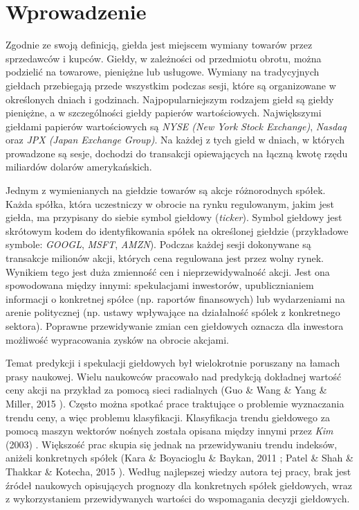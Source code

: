 \documentclass[a4paper, twoside, 11pt, openright]{article}
\newcommand{\fncymain}{%
	\fancyhead[RO]{{\footnotesize \rightmark}}
	\fancyfoot[RO]{\thepage}
	\fancyhead[LE]{{\footnotesize \leftmark}}
	\fancyfoot[LE]{\thepage}
	\fancyfoot[C]{}
	\renewcommand{\headrulewidth}{0.3pt}}
\begin{document}
\fncymain

\cleardoublepage

\tableofcontents

\cleardoublepage

\section{Wprowadzenie}

Zgodnie ze swoją definicją, giełda jest miejscem wymiany towarów przez sprzedawców i kupców. Giełdy, w zależności od przedmiotu obrotu, można podzielić na towarowe, pieniężne lub usługowe. Wymiany na tradycyjnych giełdach przebiegają przede wszystkim podczas sesji, które są organizowane w określonych dniach i godzinach. Najpopularniejszym rodzajem giełd są giełdy pieniężne, a w szczególności giełdy papierów wartościowych. Największymi giełdami papierów wartościowych są \textit{NYSE (New York Stock Exchange)}\cite{nyse}, \textit{Nasdaq}\cite{nasdaq} oraz \textit{JPX (Japan Exchange Group)}\cite{jpx}. Na każdej z tych giełd w dniach, w których prowadzone są sesje, dochodzi do transakcji opiewających na łączną kwotę rzędu miliardów dolarów amerykańskich.

\bigskip

 Jednym z wymienianych na giełdzie towarów są akcje różnorodnych spółek. Każda spółka, która uczestniczy w obrocie na rynku regulowanym, jakim jest giełda, ma przypisany do siebie symbol giełdowy (\textit{ticker}). Symbol giełdowy jest skrótowym kodem do identyfikowania spółek na określonej giełdzie (przykładowe symbole: \textit{GOOGL}, \textit{MSFT}, \textit{AMZN}). Podczas każdej sesji dokonywane są transakcje milionów akcji, których cena regulowana jest przez wolny rynek. Wynikiem tego jest duża zmienność cen i nieprzewidywalność akcji. Jest ona spowodowana między innymi: spekulacjami inwestorów, upublicznianiem informacji o konkretnej spółce (np. raportów finansowych) lub wydarzeniami na arenie politycznej (np. ustawy wpływające na działalność spólek z konkretnego sektora). Poprawne przewidywanie zmian cen giełdowych oznacza dla inwestora możliwość wypracowania zysków na obrocie akcjami.
 
\bigskip

Temat predykcji i spekulacji giełdowych był wielokrotnie poruszany na łamach prasy naukowej. Wielu naukowców pracowało nad predykcją dokładnej wartość ceny akcji na przykład za pomocą sieci radialnych (Guo \& Wang \& Yang \& Miller, 2015 \cite{paper_regression_radial}). Często można spotkać prace traktujące o problemie wyznaczania trendu ceny, a więc problemu klasyfikacji. Klasyfikacja trendu giełdowego za pomocą maszyn wektorów nośnych została opisana między innymi przez \textit{Kim} (2003) \cite{paper_classification_svm}. Większość prac skupia się jednak na przewidywaniu trendu indeksów, aniżeli konkretnych spółek (Kara \& Boyacioglu \& Baykan, 2011 \cite{paper_classification_index_istanbul}; Patel \& Shah \& Thakkar \& Kotecha, 2015 \cite{paper_classification_index_sp500}). Według najlepszej wiedzy autora tej pracy, brak jest źródeł naukowych opisujących prognozy dla konkretnych spółek giełdowych, wraz z wykorzystaniem przewidywanych wartości do wspomagania decyzji giełdowych. 
\end{document}
